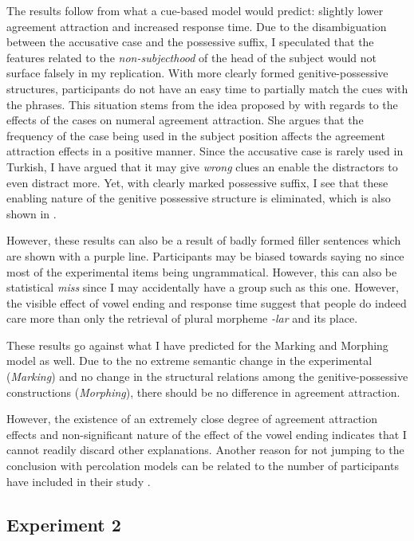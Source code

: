 \documentclass[doc]{apa6}
\begin{document}
The results follow from what a cue-based model would predict: slightly lower agreement attraction and increased response time. Due to the disambiguation between the accusative case and the possessive suffix, I speculated that the features related to the \emph{non-subjecthood} of the head of the subject would not surface falsely in my replication. With more clearly formed genitive-possessive structures, participants do not have an easy time to partially match the cues with the phrases. This situation stems from the idea proposed by \textcite{Lago2018} with regards to the effects of the cases on numeral agreement attraction. She argues that the frequency of the case being used in the subject position affects the agreement attraction effects in a positive manner. Since the accusative case is rarely used in Turkish, I have argued that it may give \emph{wrong} clues an enable the distractors to even distract more. Yet, with clearly marked possessive suffix, I see that these enabling nature of the genitive possessive structure is eliminated, which is also shown in \textcite{Avetisyan2019}.

However, these results can also be a result of badly formed filler sentences which are shown with a purple line. Participants may be biased towards saying no since most of the experimental items being ungrammatical. However, this can also be statistical \emph{miss} since I may accidentally have a group such as this one. However, the visible effect of vowel ending and response time suggest that people do indeed care more than only the retrieval of plural morpheme \emph{-lar} and its place.

These results go against what I have predicted for the Marking and Morphing model as well. Due to the no extreme semantic change in the experimental (\emph{Marking}) and no change in the structural relations among the genitive-possessive constructions (\emph{Morphing}), there should be no difference in agreement attraction.

However, the existence of an extremely close degree of agreement attraction effects and non-significant nature of the effect of the vowel ending indicates that I cannot readily discard other explanations. Another reason for not jumping to the conclusion with percolation models can be related to the number of participants \textcite{Lago2018} have included in their study \autocite[see][]{Vasishth2018}.

\hypertarget{experiment-2}{%
\subsection{Experiment 2}\label{experiment-2}}
\end{document}
